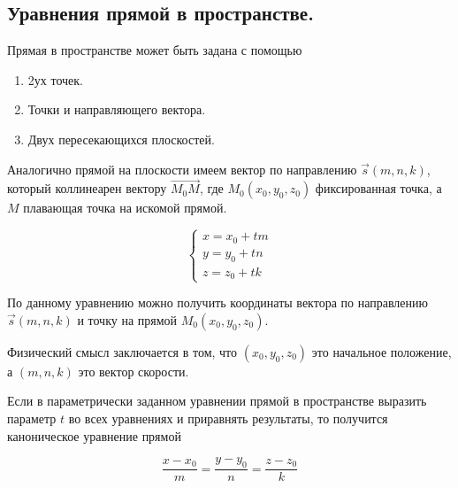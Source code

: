 \subsection{%
  Уравнения прямой в пространстве.%
}

Прямая в пространстве может быть задана с помощью

\begin{enumerate}
\item
  2ух точек.
  
\item
  Точки и направляющего вектора.
  
\item
  Двух пересекающихся плоскостей.
\end{enumerate}


Аналогично прямой на плоскости имеем вектор по направлению \(\vec{s}(m, n, k)\),
который коллинеарен вектору \(\vec{M_0M}\), где \(M_0 (x_0, y_0, z_0)\)
фиксированная точка, а \(M\) плавающая точка на искомой прямой.
  
\begin{equation*}
  \begin{cases}
    x = x_0 + t m \\
    y = y_0 + t n \\
    z = z_0 + t k
  \end{cases}
\end{equation*}

\begin{remark}
  По данному уравнению можно получить координаты вектора по направлению
  \(\vec{s}(m, n, k)\) и точку на прямой \(M_0 (x_0, y_0, z_0)\).
\end{remark}

\begin{remark}
  Физический смысл заключается в том, что \((x_0, y_0, z_0)\) это начальное
  положение, а \((m, n, k)\) это вектор скорости.
\end{remark}


Если в параметрически заданном уравнении прямой в пространстве выразить параметр
\(t\) во всех уравнениях и приравнять результаты, то получится каноническое
уравнение прямой
  
\begin{equation*}
  \frac{x - x_0}{m} = \frac{y - y_0}{n} = \frac{z - z_0}{k}
\end{equation*}

